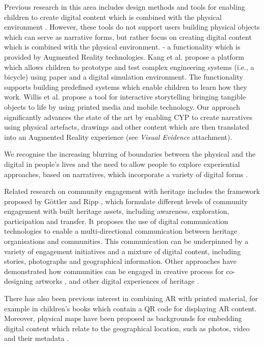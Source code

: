 \documentclass[acmlarge,screen,dvipsnames]{acmart}
\begin{document}
Previous research in this area includes design methods and tools for enabling children to create digital content which is combined with the physical environment \cite{ALHUMAIDAN201824}. 
However, these tools do not support users building physical objects which can serve as narrative forms, but rather focus on creating digital content which is combined with the physical environment.
- a functionality which is provided by Augmented Reality technologies. 
Kang et al. \cite{10.1145/3173225.3173264} propose a platform which allows children to prototype and test complex engineering systems (i.e., a bicycle) using paper and a digital simulation environment. The functionality supports building predefined systems which enable children to learn how they work. 
Willis et al. \cite{10.1145/2460625.2460682} propose a tool for interactive storytelling bringing tangible objects to life by using printed media and mobile technology. Our approach  significantly advances the state of the art by enabling CYP to create narratives using physical artefacts, drawings and other content which are then translated into an Augmented Reality experience (see \textit{Visual Evidence} attachment). 


We recognise the increasing blurring of boundaries between the physical and the digital in people's lives and the need to allow people to explore experiential approaches, based on narratives, which incorporate a variety of digital forms \cite{articleJordan}. 

Related research on community engagement
with heritage includes the framework proposed by G{\"o}ttler and Ripp
\cite{icomos1812}, which formulate different levels of community engagement
with built heritage assets, including awareness, exploration, participation
and transfer. It proposes the use of digital communication technologies to
enable a multi-directional communication between heritage organisations and
communities. This communication can be underpinned by a variety of engagement
initiatives and a mixture of digital content, including stories, photographs
and geographical information. Other approaches have demonstrated how
communities can be engaged in creative process for co-designing artworks
\cite{656aab9e240d4479bf2872665a590233}, and other digital experiences of
heritage \cite{ Avram:2019:CGL:3358680.3348793, Fox:2014:CHS:2598510.2598563,
Albouys-Perrois:2018:TMA:3173574.3174203}. 

There has also been previous interest in combining AR with printed material,
for example in children's books which contain a QR code for displaying AR
content. Moreover, physical maps have been proposed as backgrounds for
embedding digital content which relate to the geographical location, such as
photos, video and their metadata \cite{Morrison:2009:LBA:1518701.1518991,
Terracciano:2017:MMR:3027063.3052958}.
\end{document}

